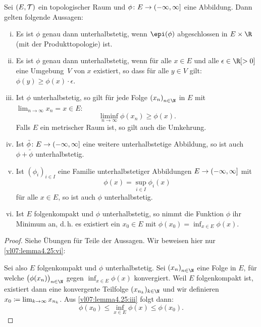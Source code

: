 \begin{thLemma} \label{vl07:lemma4.25}
    Sei $(E,\operatorname{\mathcal{T}})$ ein topologischer Raum und $\phi\colon E\to
    (-\infty,\infty]$ eine Abbildung. Dann gelten folgende Aussagen:
    \begin{enumerate}[(i)]
        \item \label{vl07:lemma4.25:i}
            Es ist $\phi$ genau dann unterhalbstetig, wenn $\epi(\phi)$
            abgeschlossen in $E\times\R$ (mit der Produkttopologie) ist.
            
        \item \label{vl07:lemma4.25:ii}
            Es ist $\phi$ genau dann unterhalbstetig, wenn für alle $x\in E$
            und alle $\epsilon\in\R[>0]$ eine Umgebung~$V$ von $x$ existiert, so
            dass für alle $y\in V$ gilt:
            $\phi(y)\geq\phi(x)\cdot\epsilon$.
            
        \item \label{vl07:lemma4.25:iii}
            Ist $\phi$ unterhalbstetig, so gilt für jede Folge $\nSeq x$ in $E$
            mit $\lim_{n\to\infty} x_n = x\in E$:
            \[ \liminf_{n\to\infty} \phi(x_n) \geq \phi(x) . \]
            Falls $E$ ein metrischer Raum ist, so gilt auch die Umkehrung.
            
        \item \label{vl07:lemma4.25:iv}
            Ist $\tilde\phi\colon E\to(-\infty,\infty]$ eine weitere
            unterhalbstetige Abbildung, so ist auch $\phi+\tilde\phi$
            unterhalbstetig.
            
        \item \label{vl07:lemma4.25:v}
            Ist $(\phi_i)_{i\in I}$ eine Familie unterhalbstetiger
            Abbildungen $E\to(-\infty,\infty]$ mit
            \[ \phi(x) = \sup_{i\in I} \phi_i(x)  \]
            für alle $x\in E$, so ist auch $\phi$ unterhalbstetig.
            
        \item \label{vl07:lemma4.25:vi}
            Ist $E$ folgenkompakt und $\phi$ unterhalbstetig, so nimmt die
            Funktion $\phi$ ihr Minimum an, d.\,h. es existiert ein
            $x_0\in E$ mit $\phi(x_0) = \inf_{x\in E} \phi(x)$.
    \end{enumerate}
\end{thLemma}

\begin{proof}
    Siehe Übungen für Teile der Aussagen. Wir beweisen hier nur
    \ref{vl07:lemma4.25:vi}:
    
    Sei also $E$ folgenkompakt und $\phi$ unterhalbstetig. Sei $\nSeq x$ eine Folge in
    $E$, für welche $\bigl(\phi(x_n)\bigr)_{n\in\N}$ gegen $\inf_{x\in E}
    \phi(x)$ konvergiert. Weil $E$ folgenkompakt ist, existiert dann eine konvergente
    Teilfolge $(x_{n_k})_{k\in\N}$ und wir definieren $x_0 \coloneqq
    \lim_{k\to\infty} x_{n_k}$. Aus \ref{vl07:lemma4.25:iii} folgt dann:
    \[ \phi(x_0) \leq \inf_{x\in E} \phi(x) \leq \phi(x_0)  . \]
\end{proof}

